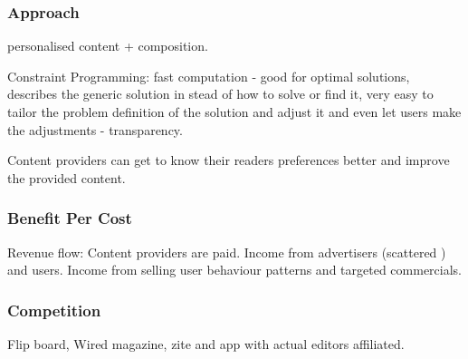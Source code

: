 \subsubsection{Approach}
personalised content + composition.

Constraint Programming: fast computation - good for optimal solutions, describes the generic solution in stead of how to solve or find it, very easy to tailor the problem definition of the solution and adjust it and even let users make the adjustments - transparency.

Content providers can get to know their readers preferences better and improve the provided content.

\subsubsection{Benefit Per Cost}
Revenue flow: Content providers are paid. Income from advertisers (scattered \cite[p. 6-7]{kristin_fredrik.pdf}) and users. Income from selling user behaviour patterns and targeted commercials.

\subsubsection{Competition}
Flip board, Wired magazine, zite and app with actual editors affiliated.


